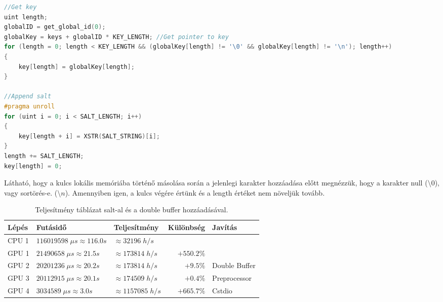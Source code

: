 \begin{lstlisting}[language={C++}]
//Get key
uint length;
globalID = get_global_id(0);
globalKey = keys + globalID * KEY_LENGTH; //Get pointer to key
for (length = 0; length < KEY_LENGTH && (globalKey[length] != '\0' && globalKey[length] != '\n'); length++)
{
    key[length] = globalKey[length];
}

//Append salt
#pragma unroll
for (uint i = 0; i < SALT_LENGTH; i++)
{
    key[length + i] = XSTR(SALT_STRING)[i];
}
length += SALT_LENGTH;
key[length] = 0;
\end{lstlisting}


Látható, hogy a kulcs lokális memóriába történő másolása során a jelenlegi karakter hozzáadása előtt megnézzük, hogy a karakter null ($\setminus 0$), vagy sortörés-e. ($\setminus n$). Amennyiben igen, a kulcs végére értünk és a length értéket nem növeljük tovább.

\begin{table}[H]
    \centering
    \begin{tabular}{l|l|l|r|l}
        \textbf{Lépés} & \textbf{Futásidő} & \textbf{Teljesítmény} & \textbf{Különbség} & \textbf{Javítás} \\
        \hline
        \hline
        
        CPU 1 & $\num{116 019 598} \; \mu s \approx \num{116.0}s $ & $\approx \num{32 196} \; h/s$ & & \\
        \hline
                            
        GPU 1 & $\num{21 490 658} \; \mu s \approx \num{21.5}s $ & $\approx \num{173 814} \; h/s$ & $+550.2\%$ & \\
        \hline
        
        GPU 2 & $\num{20 201 236} \; \mu s \approx \num{20.2}s $ & $\approx \num{173 814} \; h/s$ & $+9.5\%$ & Double Buffer \\
        \hline
        
        GPU 3 & $\num{20 112 915} \; \mu s \approx \num{20.1}s $ & $\approx \num{174 509} \; h/s$ & $+0.4\%$ & Preprocessor \\
        \hline
        
        GPU 4 & $\num{3 034 589} \; \mu s \approx \num{3.0}s $ & $\approx \num{1 157 085} \; h/s$ & $+665.7\%$ & Cstdio \\
        \hline
    \end{tabular}
    \caption{Teljesítmény táblázat salt-al és a double buffer hozzáadásával.}
\end{table}



